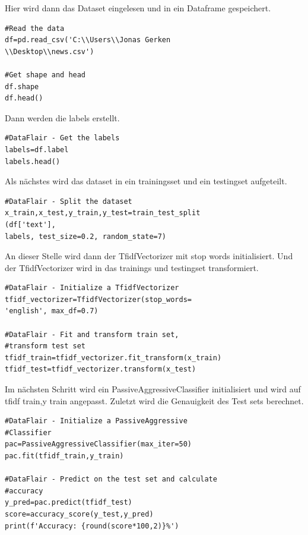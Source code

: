 \documentclass[conference]{IEEEtran}
\begin{document}
Hier wird dann das Dataset eingelesen und in ein Dataframe gespeichert.
\begin{lstlisting}
#Read the data
df=pd.read_csv('C:\\Users\\Jonas Gerken
\\Desktop\\news.csv')

#Get shape and head
df.shape
df.head()
\end{lstlisting}


Dann werden die labels erstellt.
\begin{lstlisting}
#DataFlair - Get the labels
labels=df.label
labels.head()
\end{lstlisting}

Als nächstes wird das dataset in ein trainingsset und ein testingset aufgeteilt.
\begin{lstlisting}
#DataFlair - Split the dataset
x_train,x_test,y_train,y_test=train_test_split
(df['text'], 
labels, test_size=0.2, random_state=7)
\end{lstlisting}

An dieser Stelle wird dann der TfidfVectorizer mit stop words initialisiert.
Und der TfidfVectorizer wird in das trainings und testingset transformiert.
\begin{lstlisting}
#DataFlair - Initialize a TfidfVectorizer
tfidf_vectorizer=TfidfVectorizer(stop_words=
'english', max_df=0.7)

#DataFlair - Fit and transform train set, 
#transform test set
tfidf_train=tfidf_vectorizer.fit_transform(x_train) 
tfidf_test=tfidf_vectorizer.transform(x_test)
\end{lstlisting}

Im nächsten Schritt wird ein PassiveAggressiveClassifier initialisiert und wird auf tfidf train,y train angepasst.
Zuletzt wird die Genauigkeit des Test sets berechnet.

\begin{lstlisting}
#DataFlair - Initialize a PassiveAggressive
#Classifier
pac=PassiveAggressiveClassifier(max_iter=50)
pac.fit(tfidf_train,y_train)

#DataFlair - Predict on the test set and calculate 
#accuracy
y_pred=pac.predict(tfidf_test)
score=accuracy_score(y_test,y_pred)
print(f'Accuracy: {round(score*100,2)}%')
\end{lstlisting}\cite{b5}
\end{document}
